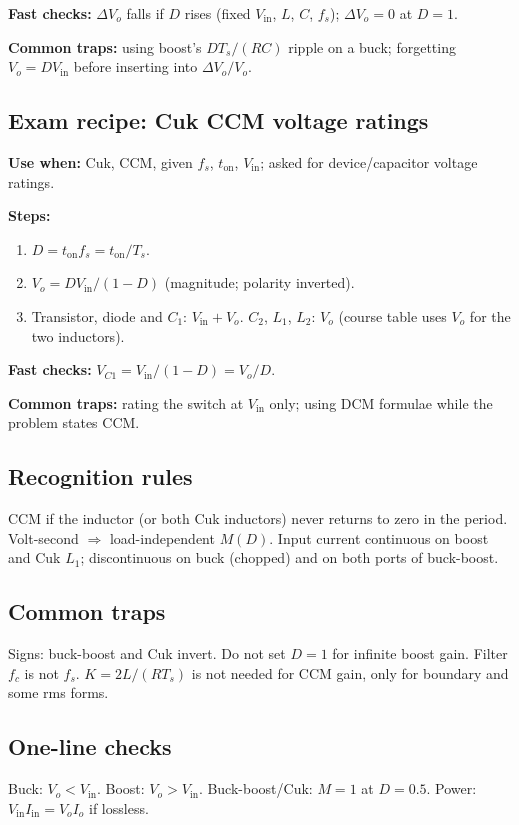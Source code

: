 \textbf{Fast checks:} \(\Delta V_o\) falls if \(D\) rises (fixed \(V_{\mathrm{in}}\), \(L\), \(C\), \(f_s\)); \(\Delta V_o=0\) at \(D=1\).

\textbf{Common traps:} using boost's \(D T_s/(RC)\) ripple on a buck; forgetting \(V_o=DV_{\mathrm{in}}\) before inserting into \(\Delta V_o/V_o\).

\subsection{Exam recipe: Cuk CCM voltage ratings}
\textbf{Use when:} Cuk, CCM, given \(f_s\), \(t_{\mathrm{on}}\), \(V_{\mathrm{in}}\); asked for device/capacitor voltage ratings.

\textbf{Steps:}
\begin{enumerate}
  \item \(D=t_{\mathrm{on}} f_s=t_{\mathrm{on}}/T_s\).
  \item \(V_o=D V_{\mathrm{in}}/(1-D)\) (magnitude; polarity inverted).
  \item Transistor, diode and \(C_1\): \(V_{\mathrm{in}}+V_o\). \(C_2\), \(L_1\), \(L_2\): \(V_o\) (course table uses \(V_o\) for the two inductors).
\end{enumerate}

\textbf{Fast checks:} \(V_{C1}=V_{\mathrm{in}}/(1-D)=V_o/D\).

\textbf{Common traps:} rating the switch at \(V_{\mathrm{in}}\) only; using DCM formulae while the problem states CCM.

\subsection{Recognition rules}
CCM if the inductor (or both Cuk inductors) never returns to zero in the period. Volt-second \(\Rightarrow\) load-independent \(M(D)\). Input current continuous on boost and Cuk \(L_1\); discontinuous on buck (chopped) and on both ports of buck-boost.

\subsection{Common traps}
Signs: buck-boost and Cuk invert. Do not set \(D=1\) for infinite boost gain. Filter \(f_c\) is not \(f_s\). \(K=2L/(RT_s)\) is not needed for CCM gain, only for boundary and some rms forms.

\subsection{One-line checks}
Buck: \(V_o<V_{\mathrm{in}}\). Boost: \(V_o>V_{\mathrm{in}}\). Buck-boost/Cuk: \(M=1\) at \(D=0.5\). Power: \(V_{\mathrm{in}}I_{\mathrm{in}}=V_o I_o\) if lossless.
